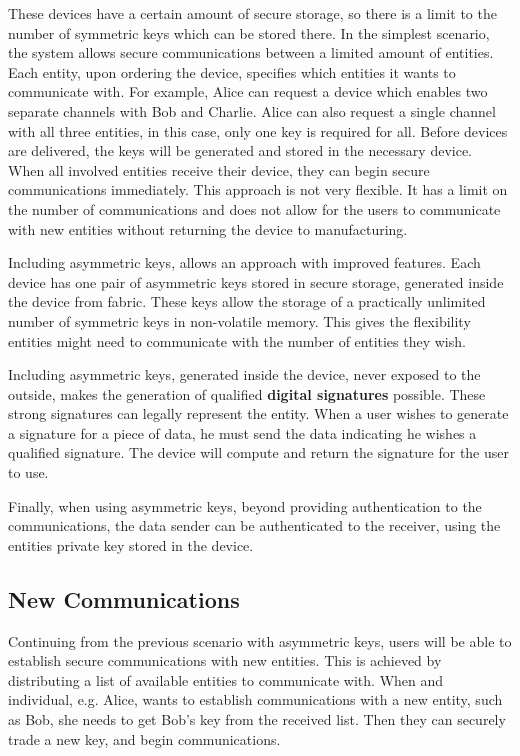 These devices have a certain amount of secure storage, so there is a limit to the number of symmetric keys which can be stored there.
In the simplest scenario, the system allows secure communications between a limited amount of entities. Each entity, upon ordering the device, specifies which entities it wants to communicate with. For example, Alice can request a device which enables two separate channels with Bob and Charlie. Alice can also request a single channel with all three entities, in this case, only one key is required for all.
Before devices are delivered, the keys will be generated and stored in the necessary device. When all involved entities receive their device, they can begin secure communications immediately.
This approach is not very flexible. It has a limit on the number of communications and does not allow for the users to communicate with new entities without returning the device to manufacturing.

Including asymmetric keys, allows an approach with improved features.
Each device has one pair of asymmetric keys stored in secure storage, generated inside the device from fabric. These keys allow the storage of a practically unlimited number of symmetric keys in non-volatile memory. This gives the flexibility entities might need to communicate with the number of entities they wish.

Including asymmetric keys, generated inside the device, never exposed to the outside, makes the generation of qualified \textbf{digital signatures} possible. These strong signatures can legally represent the entity. When a user wishes to generate a signature for a piece of data, he must send the data indicating he wishes a qualified signature. The device will compute and return the signature for the user to use.

Finally, when using asymmetric keys, beyond providing authentication to the communications, the data sender can be authenticated to the receiver, using the entities private key stored in the device.

\subsection{New Communications}\label{chap:problem:scenarios:keys}
Continuing from the previous scenario with asymmetric keys, users will be able to establish secure communications with new entities. This is achieved by distributing a list of available entities to communicate with.
When and individual, e.g. Alice, wants to establish communications with a new entity, such as Bob, she needs to get Bob's key from the received list. Then they can securely trade a new key, and begin communications.

